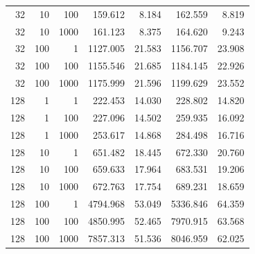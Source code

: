 \begin{longtable}{@{}rrrrrrr@{}}
32 & 10 & 100 & 159.612 & 8.184 & 162.559 & 8.819 \\
32 & 10 & 1000 & 161.123 & 8.375 & 164.620 & 9.243 \\
32 & 100 & 1 & 1127.005 & 21.583 & 1156.707 & 23.908 \\
32 & 100 & 100 & 1155.546 & 21.685 & 1184.145 & 22.926 \\
32 & 100 & 1000 & 1175.999 & 21.596 & 1199.629 & 23.552 \\
128 & 1 & 1 & 222.453 & 14.030 & 228.802 & 14.820 \\
128 & 1 & 100 & 227.096 & 14.502 & 259.935 & 16.092 \\
128 & 1 & 1000 & 253.617 & 14.868 & 284.498 & 16.716 \\
128 & 10 & 1 & 651.482 & 18.445 & 672.330 & 20.760 \\
128 & 10 & 100 & 659.633 & 17.964 & 683.531 & 19.206 \\
128 & 10 & 1000 & 672.763 & 17.754 & 689.231 & 18.659 \\
128 & 100 & 1 & 4794.968 & 53.049 & 5336.846 & 64.359 \\
128 & 100 & 100 & 4850.995 & 52.465 & 7970.915 & 63.568 \\
128 & 100 & 1000 & 7857.313 & 51.536 & 8046.959 & 62.025 \\
\end{longtable}
\endgroup
